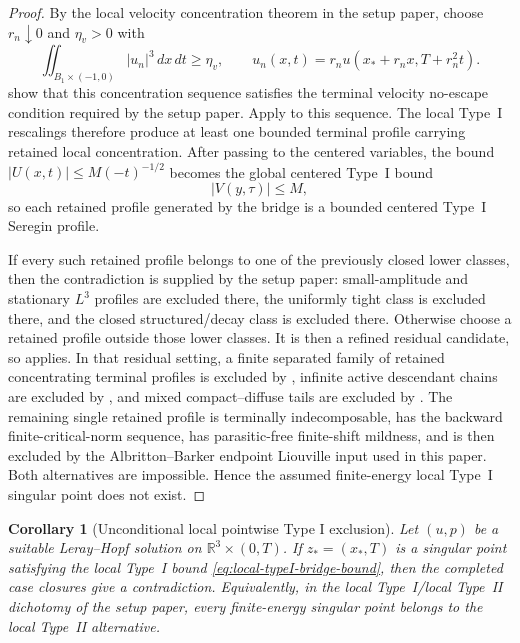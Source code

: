 \documentclass[11pt]{amsart}
\numberwithin{equation}{section}
\theoremstyle{plain}
\newtheorem{corollary}[theorem]{Corollary}
\theoremstyle{definition}
\theoremstyle{remark}
\newcommand{\R}{\mathbb R}
\begin{document}
\begin{proof}
By the local velocity concentration theorem in the setup paper, choose
\(r_n\downarrow0\) and \(\eta_v>0\) with
\[
   \iint_{B_1\times(-1,0)} |u_n|^3\,dx\,dt\ge\eta_v,
   \qquad
   u_n(x,t)=r_nu(x_*+r_nx,T+r_n^2t).
\]
show that this concentration sequence satisfies the terminal
velocity no-escape condition required by the setup paper.
Apply  to this sequence.  The
local Type~I rescalings therefore produce at least one bounded terminal profile
carrying retained local concentration.  After passing to the centered variables, the
bound \(|U(x,t)|\le M(-t)^{-1/2}\) becomes the global centered Type~I bound
\[
   |V(y,\tau)|\le M,
\]
so each retained profile generated by the bridge is a bounded centered Type~I
Seregin profile.

If every such retained profile belongs to one of the previously closed lower
classes, then the contradiction is supplied by the setup paper:
small-amplitude and stationary \(L^3\) profiles are excluded there, the
uniformly tight class is excluded there, and the closed structured/decay class
is excluded there.  Otherwise choose a retained profile outside those lower
classes.  It is then a refined residual candidate, so
 applies.  In that residual
setting, a finite separated family of retained concentrating terminal profiles
is excluded by , infinite active
descendant chains are excluded by , and mixed
compact--diffuse tails are excluded by .  The
remaining single retained profile is terminally indecomposable, has the
backward finite-critical-norm sequence, has parasitic-free finite-shift
mildness, and is then excluded by the Albritton--Barker endpoint Liouville
input used in this paper.  Both
alternatives are impossible.  Hence the assumed finite-energy local Type~I singular
point does not exist.
\end{proof}

\begin{corollary}[Unconditional local pointwise Type I exclusion]
\label{cor:local-typeI-unconditional}
Let \((u,p)\) be a suitable Leray--Hopf solution on
\(\R^3\times(0,T)\).  If \(z_*=(x_*,T)\) is a singular point satisfying the
local Type~I bound \eqref{eq:local-typeI-bridge-bound}, then the completed
case closures give a contradiction.  Equivalently, in the local
Type~I/local Type~II dichotomy of the setup paper, every finite-energy
singular point
belongs to the local Type~II alternative.
\end{corollary}
\end{document}
